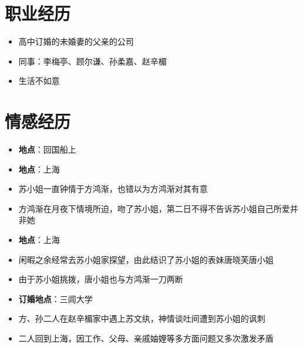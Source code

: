 \documentclass{resume}
\begin{document}
\section{职业经历}

\begin{itemize}[parsep=0.5ex]
  \item 高中订婚的未婚妻的父亲的公司
\end{itemize}

\begin{itemize}[parsep=0.5ex]
  \item 同事：李梅亭、顾尔谦、孙柔嘉、赵辛楣
\end{itemize}

\begin{itemize}[parsep=0.5ex]
  \item 生活不如意
\end{itemize}

\section{情感经历}
\begin{itemize}[parsep=0.5ex]
  \item \textbf{地点}：回国船上
\end{itemize}

\begin{itemize}[parsep=0.5ex]
  \item \textbf{地点}：上海
  \item 苏小姐一直钟情于方鸿渐，也错以为方鸿渐对其有意
  \item 方鸿渐在月夜下情境所迫，吻了苏小姐，第二日不得不告诉苏小姐自己所爱并非她
\end{itemize}

\begin{itemize}[parsep=0.5ex]
  \item \textbf{地点}：上海
  \item 闲暇之余经常去苏小姐家探望，由此结识了苏小姐的表妹唐晓芙唐小姐
  \item 由于苏小姐挑拨，唐小姐也与方鸿渐一刀两断
\end{itemize}

\begin{itemize}[parsep=0.5ex]
  \item \textbf{订婚地点}：三闾大学
  \item 方、孙二人在赵辛楣家中遇上苏文纨，神情谈吐间遭到苏小姐的讽刺
  \item 二人回到上海，因工作、父母、亲戚妯娌等多方面问题又多次激发矛盾
\end{itemize}
\end{document}
